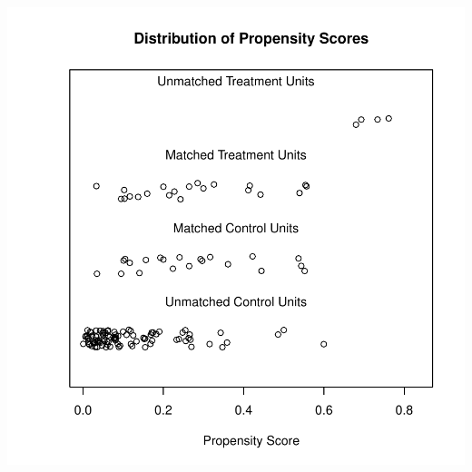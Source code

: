 \documentclass[12pt, a4paper]{article}
\begin{document}
\includegraphics{seminar-App2}
\end{document}
